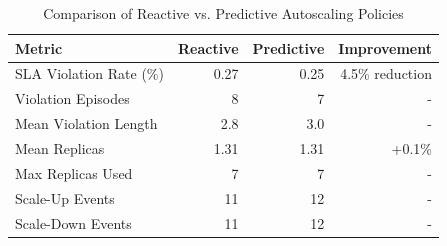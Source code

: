 
\begin{table}[htbp]
\centering
\caption{Comparison of Reactive vs. Predictive Autoscaling Policies}
\label{tab:autoscaling_results}
\begin{tabular}{lrrr}
\toprule
\textbf{Metric} & \textbf{Reactive} & \textbf{Predictive} & \textbf{Improvement} \\
\midrule
SLA Violation Rate (\%) & 0.27 & 0.25 & 4.5\% reduction \\
Violation Episodes & 8 & 7 & - \\
Mean Violation Length & 2.8 & 3.0 & - \\
Mean Replicas & 1.31 & 1.31 & +0.1\% \\
Max Replicas Used & 7 & 7 & - \\
Scale-Up Events & 11 & 12 & - \\
Scale-Down Events & 11 & 12 & - \\
\bottomrule
\end{tabular}
\end{table}
